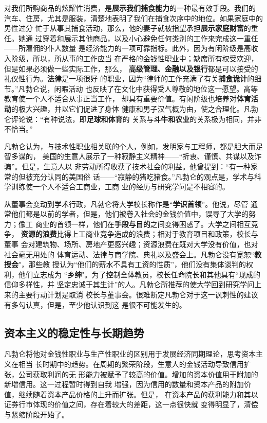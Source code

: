 对我们所购商品的炫耀性消费，是\textbf{展示我们捕食能力}的一种最有效手段。我们的
汽车、住房，尤其是服装，清楚地表明了我们在捕食次序中的地位。如果家庭中的男性过分
忙于从事其捕食活动，那么，他的妻子就被指望承担\textbf{展示家庭财富}的重任。她通
过穿着和展示其他商品，以及小心避免任何类别的工作来完成这一重任——所雇佣的仆人数量
是经济能力的一项可靠指标。此外，因为有闲阶级是高收入阶级，所以，所从事的工作应当
在严格的金钱性职业中；缺席所有权受欢迎，但是如果必须做一些实际工作，那么，
\textbf{高级管理、金融以及银行}都是可以接受的礼仪性行为。\textbf{法律}是一项很好
的职业，因为“律师的工作充满了有关\textbf{捕食诡计}的细节。”凡勃仑说，闲暇活动
也反映了在文化中获得受人尊敬的地位这一愿望。高等教育使一个人不适合从事正当工作，
却具有重要价值。有闲阶级也培养对\textbf{体育活动}的极大兴趣，并以它们促进了身体
健康和男子汉气概为由，使之合理化。凡勃仑评论说：“有种说法，即\textbf{足球和体育}的
关系与\textbf{斗牛和农业}的关系极为相同，并非不恰当。”

凡勃仑认为，与技术性职业相关联的个人，例如，发明家与工程师，都是胆大而足智多谋的，
美国的生意人展示了一种寂静主义精神——“折衷、谨慎、共谋以及诈骗”。但是，生意人以
非劳动所得收获了技术社会的利益。他曾提到：“有一种家常的但被充分认同的美国俗
话——“寂静的猪吃猪食。”凡勃仑的观点是，学术与科学训练使一个人不适合工商业，工商
业的经历与研究学问是不相容的。

从董事会变动到学术行政，凡勃仑将大学校长称作是“\textbf{学识首领}”。他说，尽管
通常他们都是以前的学者，但是，他们被卷入社会的金钱价值中，误导了大学的努力；像工
商业的首领一样，他们在\textbf{手段与目的}之间变得困惑了。大学之间相互竞争，
\textbf{资源的浪费}比得上工商业竞争造成的浪费；相对于教育项目和政策，校长与董事
会对建筑物、场所、房地产更感兴趣；资源浪费在既对大学没有价值，也对社会毫无用处的
体育运动、法律与商学院、典礼以及盛会上。凡勃仑没有宽恕“\textbf{教授会}"，那些教
授认为“他们的薪水不具有工资的性质”，他们没有集体谈判的权利，他们立志成为
“\textbf{乡绅}"。为了控制全体教员，校长任命院长和其他具有“现成的信仰多样性，并
坚定忠诚于其生计”的人。凡勃仑所推荐的使大学回到研究学问上来的主要行动计划是取消
校长与董事会。很难断定凡勃仑对于这一讽刺性的建议有多勾认真，但是，至少他认识到这
是很不可能发生的。

\clearpage

\subsection{资本主义的稳定性与长期趋势}

凡勃仑将他对金钱性职业与生产性职业的区别用于发展经济同期理论，思考资本主义在相当
长时期中的趋势。在周期的繁荣阶段，生意人的金钱活动导致信用扩张，公司获取利润的无
形能力被赋予了较高的价值。增加的资本价值用于附加的新增信用。这一过程暂时得到自我
增强，因为信用的数量和资本产品的附加价值，继续随着资本产品价格的上升而扩张。但是，
在资本产品的获利能力和其以证券行市体现的价值之间，存在着较大的差距，这一点很快就
变得明显了，清偿与紧缩阶段开始了。

